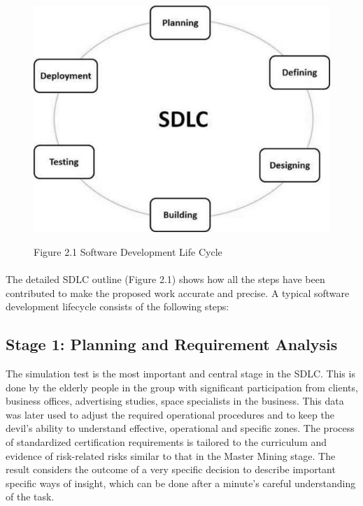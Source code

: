 \documentclass[oneside,12pt]{Classes/VTU}
\begin{document}
    	\begin{figure}
    		\begin{center}
    			\includegraphics[scale=0.8]{images/sdlc.png}
    		\end{center}
    		
    		
    		\begin{center}
    			Figure 2.1 Software Development Life Cycle
    		\end{center}
    	\end{figure}
    
    	\paragraph{}
    	The detailed SDLC outline (Figure 2.1) shows how all the steps have been contributed to make the proposed work accurate and precise.
    	A typical software development lifecycle consists of the following steps:
    	
    	 \subsection{Stage 1: Planning and Requirement Analysis}
    	The simulation test is the most important and central stage in the SDLC. This is done by the elderly people in the group with significant participation from clients, business offices, advertising studies, space specialists in the business. This data was later used to adjust the required operational procedures and to keep the devil's ability to understand effective, operational and specific zones. The process of standardized certification requirements is tailored to the curriculum and evidence of risk-related risks similar to that in the Master Mining stage. The result considers the outcome of a very specific decision to describe important specific ways of insight, which can be done after a minute's careful understanding of the task.
    	
\end{document}
